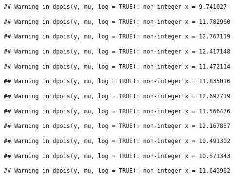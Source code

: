 \documentclass[
]{article}
\begin{document}
\begin{verbatim}
## Warning in dpois(y, mu, log = TRUE): non-integer x = 9.741027
\end{verbatim}

\begin{verbatim}
## Warning in dpois(y, mu, log = TRUE): non-integer x = 11.782960
\end{verbatim}

\begin{verbatim}
## Warning in dpois(y, mu, log = TRUE): non-integer x = 12.767119
\end{verbatim}

\begin{verbatim}
## Warning in dpois(y, mu, log = TRUE): non-integer x = 12.417148
\end{verbatim}

\begin{verbatim}
## Warning in dpois(y, mu, log = TRUE): non-integer x = 11.472114
\end{verbatim}

\begin{verbatim}
## Warning in dpois(y, mu, log = TRUE): non-integer x = 11.835016
\end{verbatim}

\begin{verbatim}
## Warning in dpois(y, mu, log = TRUE): non-integer x = 12.697719
\end{verbatim}

\begin{verbatim}
## Warning in dpois(y, mu, log = TRUE): non-integer x = 11.566476
\end{verbatim}

\begin{verbatim}
## Warning in dpois(y, mu, log = TRUE): non-integer x = 12.167857
\end{verbatim}

\begin{verbatim}
## Warning in dpois(y, mu, log = TRUE): non-integer x = 10.491302
\end{verbatim}

\begin{verbatim}
## Warning in dpois(y, mu, log = TRUE): non-integer x = 10.571343
\end{verbatim}

\begin{verbatim}
## Warning in dpois(y, mu, log = TRUE): non-integer x = 11.643962
\end{verbatim}
\end{document}
